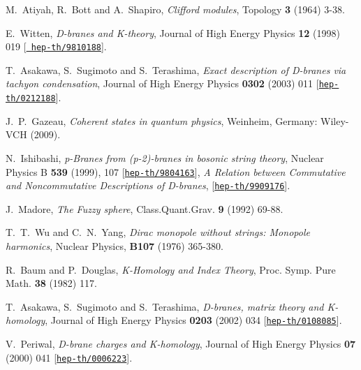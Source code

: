 \documentclass[12pt]{article}
\numberwithin{equation}{section}
\begin{document}
\begin{thebibliography}{10}
{
M.~Atiyah, R.~Bott and A.~Shapiro, {\it {Clifford modules}},  {Topology} {\bf 3} (1964) 3-38.}

{
E.~Witten, {\it {D-branes and K-theory}}, {Journal of High Energy Physics} {\bf 12} (1998) 019 [\href{http://arXiv.org/abs/9810188}{{\tt
  hep-th/9810188}}].}

{
T.~Asakawa, S.~Sugimoto and S.~Terashima, {\it {Exact description of D-branes via
tachyon condensation}},  { Journal of High Energy Physics} {\bf 0302} (2003) 011
  [\href{http://arXiv.org/abs/0212188}{{\tt hep-th/0212188}}].}

{
J.~P.~Gazeau, {\it {Coherent states in quantum physics}}, Weinheim, Germany: Wiley-
VCH (2009).}

N.~Ishibashi, {\it {p-Branes from (p-2)-branes in bosonic string theory}},
  { Nuclear Physics B} {\bf 539} (1999), 107
    [\href{http://arXiv.org/abs/9804163}{{\tt hep-th/9804163}}],
{{\it {A Relation between Commutative and
Noncommutative Descriptions of D-branes}}, [\href{http://arXiv.org/abs/9909176}{{\tt hep-th/9909176}}].}

  
{
J.~Madore, {\it {The Fuzzy sphere}}, {Class.Quant.Grav.} {\bf 9} (1992) 69-88.}

{
T.~T.~Wu and C.~N.~Yang, {\it {Dirac monopole without strings: Monopole harmonics}},
Nuclear Physics, {\bf B107} (1976) 365-380.}

R.~Baum and P.~Douglas, {\it {K-Homology and Index Theory}},  { Proc. Symp.
  Pure Math.} {\bf 38} (1982) 117.


T.~Asakawa, S.~Sugimoto and S.~Terashima, {\it {D-branes, matrix theory and
  K-homology}},  { Journal of High Energy Physics} {\bf 0203} (2002) 034
  [\href{http://arXiv.org/abs/0108085}{{\tt hep-th/0108085}}].

{
V.~Periwal, {\it {D-brane charges and K-homology}},  { Journal of High Energy Physics} {\bf 07} (2000) 041
  [\href{http://arXiv.org/abs/0006223}{{\tt hep-th/0006223}}].}


\end{thebibliography}
\end{document}
